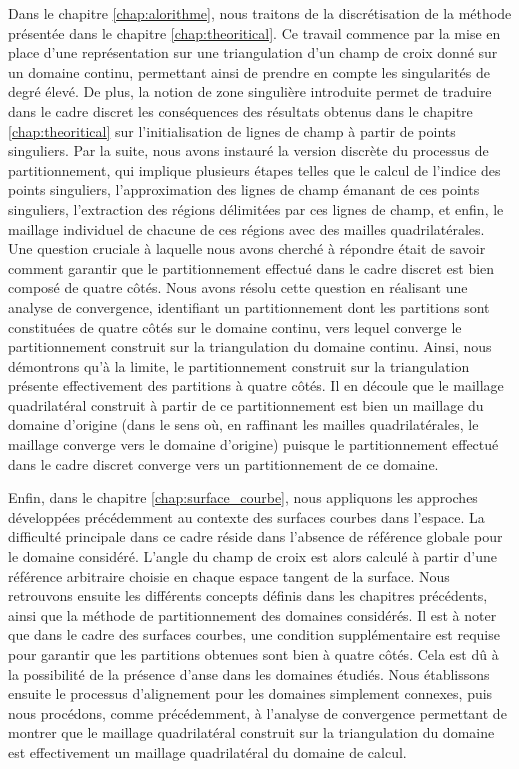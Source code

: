 Dans le chapitre \ref{chap:alorithme}, nous traitons de la discrétisation de la méthode présentée dans le chapitre \ref{chap:theoritical}. Ce travail commence par la mise en place d'une représentation sur une triangulation d'un champ de croix donné sur un domaine continu, permettant ainsi de prendre en compte les singularités de degré élevé. De plus, la notion de zone singulière introduite permet de traduire dans le cadre discret les conséquences des résultats obtenus dans le chapitre \ref{chap:theoritical} sur l'initialisation de lignes de champ à partir de points singuliers. Par la suite, nous avons instauré la version discrète du processus de partitionnement, qui implique plusieurs étapes telles que le calcul de l'indice des points singuliers, l'approximation des lignes de champ émanant de ces points singuliers, l'extraction des régions délimitées par ces lignes de champ, et enfin, le maillage individuel de chacune de ces régions avec des mailles quadrilatérales. Une question cruciale à laquelle nous avons cherché à répondre était de savoir comment garantir que le partitionnement effectué dans le cadre discret est bien composé de quatre côtés. Nous avons résolu cette question en réalisant une analyse de convergence, identifiant un partitionnement dont les partitions sont constituées de quatre côtés sur le domaine continu, vers lequel converge le partitionnement construit sur la triangulation du domaine continu. Ainsi, nous démontrons qu'à la limite, le partitionnement construit sur la triangulation présente effectivement des partitions à quatre côtés. Il en découle que le maillage quadrilatéral construit à partir de ce partitionnement est bien un maillage du domaine d'origine (dans le sens où, en raffinant les mailles quadrilatérales, le maillage converge vers le domaine d'origine) puisque le partitionnement effectué dans le cadre discret converge vers un partitionnement de ce domaine.

Enfin, dans le chapitre \ref{chap:surface_courbe}, nous appliquons les approches développées précédemment au contexte des surfaces courbes dans l'espace. La difficulté principale dans ce cadre réside dans l'absence de référence globale pour le domaine considéré. L'angle du champ de croix est alors calculé à partir d'une référence arbitraire choisie en chaque espace tangent de la surface. Nous retrouvons ensuite les différents concepts définis dans les chapitres précédents, ainsi que la méthode de partitionnement des domaines considérés. Il est à noter que dans le cadre des surfaces courbes, une condition supplémentaire est requise pour garantir que les partitions obtenues sont bien à quatre côtés. Cela est dû à la possibilité de la présence d'anse dans les domaines étudiés. Nous établissons ensuite le processus d'alignement pour les domaines simplement connexes, puis nous procédons, comme précédemment, à l'analyse de convergence permettant de montrer que le maillage quadrilatéral construit sur la triangulation du domaine est effectivement un maillage quadrilatéral du domaine de calcul.

